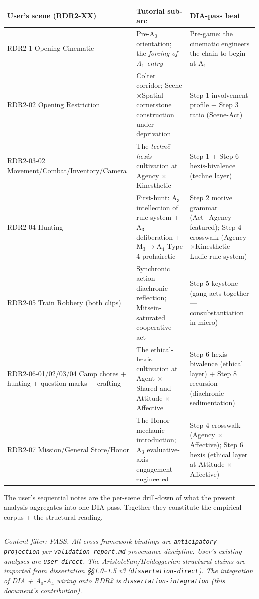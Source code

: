 \documentclass[11pt]{report}
\begin{document}
\begin{table}[H]
\renewcommand{\arraystretch}{1.25}
\begin{tabularx}{\textwidth}{>{\RaggedRight\arraybackslash}X>{\RaggedRight\arraybackslash}X>{\RaggedRight\arraybackslash}X}
\toprule
User's scene (RDR2-XX) & Tutorial sub-arc & DIA-pass beat \\
\midrule
RDR2-1 Opening Cinematic & Pre-A$_0$ orientation; the \textit{forcing of A$_1$-entry} & Pre-game: the cinematic engineers the chain to begin at A$_1$ \\
RDR2-02 Opening Restriction & Colter corridor; Scene $\times$\allowbreak  Spatial cornerstone construction under deprivation & Step 1 involvement profile + Step 3 ratio (Scene-Act) \\
RDR2-03-02 Movement/Combat/Inventory/Camera & The \textit{technē-hexis} cultivation at Agency $\times$\allowbreak  Kinesthetic & Step 1 + Step 6 hexis-bivalence (technē layer) \\
RDR2-04 Hunting & First-hunt: A$_3$ intellection of rule-system + A$_3$ deliberation + M$_3$$\rightarrow$\allowbreak A$_4$ Type 4 prohairetic & Step 2 motive grammar (Act+Agency featured); Step 4 crosswalk (Agency $\times$\allowbreak  Kinesthetic + Ludic-rule-system) \\
RDR2-05 Train Robbery (both clips) & Synchronic action + diachronic reflection; Mitsein-saturated cooperative act & Step 5 keystone (gang acts together — consubstantiation in micro) \\
RDR2-06-01/02/03/04 Camp chores + hunting + question marks + crafting & The ethical-hexis cultivation at Agent $\times$\allowbreak  Shared and Attitude $\times$\allowbreak  Affective & Step 6 hexis-bivalence (ethical layer) + Step 8 recursion (diachronic sedimentation) \\
RDR2-07 Mission/General Store/Honor & The Honor mechanic introduction; A$_3$ evaluative-axis engagement engineered & Step 4 crosswalk (Agency $\times$\allowbreak  Affective); Step 6 hexis (ethical layer at Attitude $\times$\allowbreak  Affective) \\
\bottomrule
\end{tabularx}
\end{table}


The user's sequential notes are the per-scene drill-down of what the present analysis aggregates into one DIA pass. Together they constitute the empirical corpus + the structural reading.


\vspace{0.4em}\hrule\vspace{0.8em}


\textit{Content-filter: PASS. All cross-framework bindings are \texttt{anticipatory-\discretionary{}{}{}projection} per \texttt{validation-\discretionary{}{}{}report.\discretionary{}{}{}md} provenance discipline. User's existing analyses are \texttt{user-\discretionary{}{}{}direct}. The Aristotelian/Heideggerian structural claims are imported from dissertation §§1.0–1.5 v3 (\texttt{dissertation-\discretionary{}{}{}direct}). The integration of DIA + A$_0$-A$_4$ wiring onto RDR2 is \texttt{dissertation-\discretionary{}{}{}integration} (this document's contribution).}


\clearpage
\end{document}
